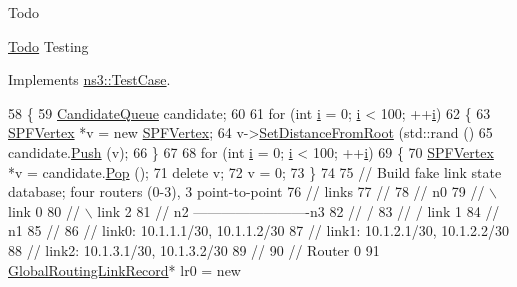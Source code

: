 \begin{DoxyRefDesc}{Todo}
\item[\hyperlink{todo__todo000068}{Todo}]Testing \end{DoxyRefDesc}


Implements \hyperlink{classns3_1_1TestCase_a8ff74680cf017ed42011e4be51917a24}{ns3\+::\+Test\+Case}.


\begin{DoxyCode}
58 \{
59   \hyperlink{classns3_1_1CandidateQueue}{CandidateQueue} candidate;
60 
61   \textcolor{keywordflow}{for} (\textcolor{keywordtype}{int} \hyperlink{bernuolliDistribution_8m_a6f6ccfcf58b31cb6412107d9d5281426}{i} = 0; \hyperlink{bernuolliDistribution_8m_a6f6ccfcf58b31cb6412107d9d5281426}{i} < 100; ++\hyperlink{bernuolliDistribution_8m_a6f6ccfcf58b31cb6412107d9d5281426}{i})
62     \{
63       \hyperlink{classns3_1_1SPFVertex}{SPFVertex} *v = \textcolor{keyword}{new} \hyperlink{classns3_1_1SPFVertex}{SPFVertex};
64       v->\hyperlink{classns3_1_1SPFVertex_a30885442cd0d8f7ae0e4690373b2c50a}{SetDistanceFromRoot} (std::rand () %
65       candidate.\hyperlink{classns3_1_1CandidateQueue_a52f6bdb3651569f349f5e522ccc4d88f}{Push} (v);
66     \}
67 
68   \textcolor{keywordflow}{for} (\textcolor{keywordtype}{int} \hyperlink{bernuolliDistribution_8m_a6f6ccfcf58b31cb6412107d9d5281426}{i} = 0; \hyperlink{bernuolliDistribution_8m_a6f6ccfcf58b31cb6412107d9d5281426}{i} < 100; ++\hyperlink{bernuolliDistribution_8m_a6f6ccfcf58b31cb6412107d9d5281426}{i})
69     \{
70       \hyperlink{classns3_1_1SPFVertex}{SPFVertex} *v = candidate.\hyperlink{classns3_1_1CandidateQueue_a7a9b3855349e02e76cd6f67a556a2ac9}{Pop} ();
71       \textcolor{keyword}{delete} v;
72       v = 0;
73     \}
74 
75   \textcolor{comment}{// Build fake link state database; four routers (0-3), 3 point-to-point}
76   \textcolor{comment}{// links}
77   \textcolor{comment}{//}
78   \textcolor{comment}{//   n0}
79   \textcolor{comment}{//      \(\backslash\) link 0}
80   \textcolor{comment}{//       \(\backslash\)          link 2}
81   \textcolor{comment}{//        n2 -------------------------n3}
82   \textcolor{comment}{//       /}
83   \textcolor{comment}{//      / link 1}
84   \textcolor{comment}{//    n1}
85   \textcolor{comment}{//}
86   \textcolor{comment}{//  link0:  10.1.1.1/30, 10.1.1.2/30}
87   \textcolor{comment}{//  link1:  10.1.2.1/30, 10.1.2.2/30}
88   \textcolor{comment}{//  link2:  10.1.3.1/30, 10.1.3.2/30}
89   \textcolor{comment}{//}
90   \textcolor{comment}{// Router 0}
91   \hyperlink{classns3_1_1GlobalRoutingLinkRecord}{GlobalRoutingLinkRecord}* lr0 = \textcolor{keyword}{new} 

\end{DoxyCode}
